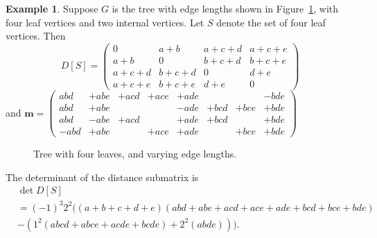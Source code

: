 \documentclass[12pt]{amsart}
\theoremstyle{definition}
\newtheorem{eg}[thm]{Example}
\newcommand{\boldm}{\mathbf{m}}
\begin{document}
\begin{eg}
Suppose $G$ is the tree with edge lengths shown in Figure~\ref{fig:tree-4}, with four leaf vertices and two internal vertices.
Let $S$ denote the set of four leaf vertices.
Then
\[
	D[S] = \begin{pmatrix}
	0 & a + b & a + c + d & a + c + e \\
	a + b & 0 & b + c + d & b + c + e \\
	a + c + d & b + c + d & 0 & d + e \\
	a + c + e & b + c + e & d + e & 0
	\end{pmatrix}
\]
and 
$\boldm = 
\begin{pmatrix}
abd & + abe & + acd & + ace & + ade & & & - bde \\
abd & + abe & & &  - ade & + bcd & + bce & + bde \\
abd & - abe & + acd & & + ade & + bcd & & + bde \\
-abd & + abe & & + ace & + ade & & + bce & + bde
\end{pmatrix}
$
\begin{figure}[h]
\centering
{}
\caption{Tree with four leaves, and varying edge lengths.}
\label{fig:tree-4}
\end{figure}

The determinant of the distance submatrix is
\begin{align}
	& \det D[S] \\
	&= (-1)^3 2^2 \Big( (a + b + c + d + e) (abd + abe + acd + ace + ade + bcd + bce + bde) \\
	&- (1^2(abcd + abce + acde + bcde) + 2^2 (abde)) \Big).
\end{align}
\end{eg}






 


\vspace{3mm}
\end{document}
